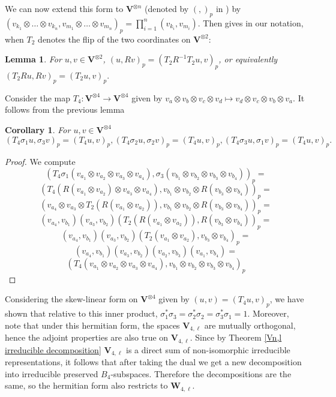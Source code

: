 \documentclass[letterpaper]{amsart}
\newtheorem{lemma}[theorem]{Lemma}
\newtheorem{corollary}[theorem]{Corollary}
\begin{document}
We can now extend this form to $\textbf{V}^{\otimes n}$ (denoted by $( , )_p$ in \cite{wenzl1998C}) by $(v_{k_1} \otimes \dots \otimes v_{k_n}, v_{m_1} \otimes \dots \otimes v_{m_n})_p = \prod_{i=1}^n (v_{k_i}, v_{m_i})$. Then \cite[Lemma 1.4.1 part (e)]{wenzl1998C} gives in our notation, when $T_2$ denotes the flip of the two coordinates on $\textbf{V}^{\otimes 2}$:
\begin{lemma}
    For $u,v \in \textbf{V}^{\otimes 2}$, $(u, Rv)_p = (T_2R^{-1}T_2u, v)_p$, or equivalently $(T_2Ru, Rv)_p = (T_2u, v)_p.$
\end{lemma}
Consider the map $T_4: \textbf{V}^{\otimes 4} \to \textbf{V}^{\otimes 4}$ given by $v_a \otimes v_b \otimes v_c \otimes v_d \mapsto v_d \otimes v_c \otimes v_b \otimes v_a$. It follows from the previous lemma
\begin{corollary}
For $u, v \in \textbf{V}^{\otimes 4}$
$$(T_4\sigma_1 u, \sigma_3 v)_p = (T_4u, v)_p, (T_4\sigma_2u, \sigma_2v)_p = (T_4u, v)_p, (T_4\sigma_3u, \sigma_1v)_p = (T_4u, v)_p.$$
\end{corollary}
\begin{proof}
    We compute
    $$(T_4\sigma_1 (v_{a_1} \otimes v_{a_2} \otimes v_{a_3} \otimes v_{a_4}), \sigma_3 (v_{b_1} \otimes v_{b_2} \otimes v_{b_3} \otimes v_{b_4}))_p =$$
    $$(T_4(R(v_{a_1} \otimes v_{a_2}) \otimes v_{a_3} \otimes v_{a_4}), v_{b_1} \otimes v_{b_2} \otimes R(v_{b_3} \otimes v_{b_4}))_p =$$
    $$(v_{a_4} \otimes v_{a_3} \otimes T_2(R(v_{a_1} \otimes v_{a_2})), v_{b_1} \otimes v_{b_2} \otimes R(v_{b_3} \otimes v_{b_4}))_p =$$
    $$(v_{a_4},v_{b_1})(v_{a_3},v_{b_2})(T_2(R(v_{a_1} \otimes v_{a_2})), R(v_{b_3} \otimes v_{b_4}))_p = $$
    $$(v_{a_4},v_{b_1})(v_{a_3},v_{b_2})(T_2(v_{a_1} \otimes v_{a_2}), v_{b_3} \otimes v_{b_4})_p =$$$$(v_{a_4},v_{b_1})(v_{a_3},v_{b_2})(v_{a_2}, v_{b_3}) (v_{a_1}, v_{b_4}) =$$
    $$(T_4(v_{a_1} \otimes v_{a_2} \otimes v_{a_3} \otimes v_{a_4}), v_{b_1} \otimes v_{b_2} \otimes v_{b_3} \otimes v_{b_4})_p$$
\end{proof}
Considering the skew-linear form on $\textbf{V}^{\otimes 4}$ given by $(u, v) = (T_4u, v)_p$, we have shown that relative to this inner product, $\sigma_1^\ast \sigma_3 = \sigma_2^\ast \sigma_2 = \sigma_3^\ast \sigma_1 = 1$. Moreover, note that under this hermitian form, the spaces $\textbf{V}_{4, \ell}$ are mutually orthogonal, hence the adjoint properties are also true on $\textbf{V}_{4, \ell}$. Since by Theorem \ref{Vn,l irreducible decomposition} $\textbf{V}_{4, \ell}$ is a direct sum of non-isomorphic irreducible representations, it follows that after taking the dual we get a new decomposition into irreducible preserved $B_4$-subspaces. Therefore the decompositions are the same, so the hermitian form also restricts to $\textbf{W}_{4, \ell}.$
\end{document}
